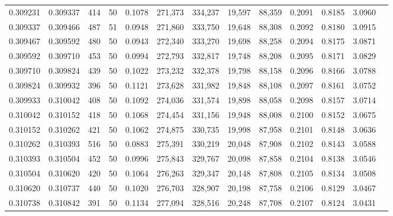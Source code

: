 \begin{tabular}{rrrrrrrrrrrrr}
0.309231 & 0.309337 &   414 &  50 &                                     0.1078 & 271,373 & 334,237 &  19,597 &  88,359 & 0.2091 & 0.8185 & 3.0960 \\
0.309337 & 0.309466 &   487 &  51 &                                     0.0948 & 271,860 & 333,750 &  19,648 &  88,308 & 0.2092 & 0.8180 & 3.0915 \\
0.309467 & 0.309592 &   480 &  50 &                                     0.0943 & 272,340 & 333,270 &  19,698 &  88,258 & 0.2094 & 0.8175 & 3.0871 \\
0.309592 & 0.309710 &   453 &  50 &                                     0.0994 & 272,793 & 332,817 &  19,748 &  88,208 & 0.2095 & 0.8171 & 3.0829 \\
0.309710 & 0.309824 &   439 &  50 &                                     0.1022 & 273,232 & 332,378 &  19,798 &  88,158 & 0.2096 & 0.8166 & 3.0788 \\
0.309824 & 0.309932 &   396 &  50 &                                     0.1121 & 273,628 & 331,982 &  19,848 &  88,108 & 0.2097 & 0.8161 & 3.0752 \\
0.309933 & 0.310042 &   408 &  50 &                                     0.1092 & 274,036 & 331,574 &  19,898 &  88,058 & 0.2098 & 0.8157 & 3.0714 \\
0.310042 & 0.310152 &   418 &  50 &                                     0.1068 & 274,454 & 331,156 &  19,948 &  88,008 & 0.2100 & 0.8152 & 3.0675 \\
0.310152 & 0.310262 &   421 &  50 &                                     0.1062 & 274,875 & 330,735 &  19,998 &  87,958 & 0.2101 & 0.8148 & 3.0636 \\
0.310262 & 0.310393 &   516 &  50 &                                     0.0883 & 275,391 & 330,219 &  20,048 &  87,908 & 0.2102 & 0.8143 & 3.0588 \\
0.310393 & 0.310504 &   452 &  50 &                                     0.0996 & 275,843 & 329,767 &  20,098 &  87,858 & 0.2104 & 0.8138 & 3.0546 \\
0.310504 & 0.310620 &   420 &  50 &                                     0.1064 & 276,263 & 329,347 &  20,148 &  87,808 & 0.2105 & 0.8134 & 3.0508 \\
0.310620 & 0.310737 &   440 &  50 &                                     0.1020 & 276,703 & 328,907 &  20,198 &  87,758 & 0.2106 & 0.8129 & 3.0467 \\
0.310738 & 0.310842 &   391 &  50 &                                     0.1134 & 277,094 & 328,516 &  20,248 &  87,708 & 0.2107 & 0.8124 & 3.0431 \\

\end{tabular}
